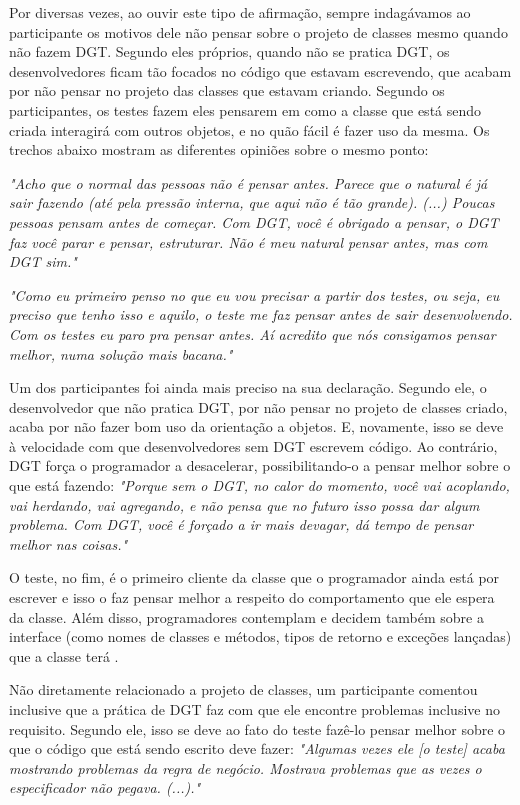 Por diversas vezes, ao ouvir este tipo de afirmação, sempre indagávamos ao participante
os motivos dele não pensar sobre o projeto de classes mesmo quando não fazem DGT. 
Segundo eles próprios, quando não se pratica DGT, os desenvolvedores ficam
tão focados no código que estavam escrevendo, que acabam por não pensar no
projeto das classes que estavam criando. Segundo os participantes, os testes fazem eles pensarem
em como a classe que está sendo criada interagirá com outros objetos, e no quão
fácil é fazer uso da mesma.
Os trechos abaixo mostram as diferentes opiniões sobre o mesmo ponto:

\textit{"Acho que o normal das pessoas não é pensar antes. Parece que o natural
é já sair fazendo (até pela pressão interna, que aqui não é tão grande). (...) Poucas pessoas pensam
antes de começar. Com DGT, você é obrigado a pensar, o DGT faz você parar e pensar, estruturar. Não
é meu natural pensar antes, mas com DGT sim."}

\textit{"Como eu primeiro penso no que eu vou precisar a partir dos testes, ou seja, eu preciso que tenho
isso e aquilo, o teste me faz pensar antes de sair desenvolvendo. Com os testes eu paro pra pensar antes.
Aí acredito que nós consigamos pensar melhor, numa solução mais bacana."}

Um dos participantes foi ainda mais preciso na sua declaração. Segundo ele, o desenvolvedor que não pratica
DGT, por não pensar no projeto de classes criado, acaba por não fazer bom uso da orientação a objetos.
E, novamente, isso se deve à velocidade com que desenvolvedores sem DGT escrevem código. Ao contrário,
DGT força o programador a desacelerar, possibilitando-o a pensar melhor sobre o que está fazendo:
\textit{"Porque sem o DGT, no calor do momento, você vai acoplando, vai herdando, vai agregando, e não pensa
que no futuro isso possa dar algum problema. Com DGT, você é forçado a ir mais devagar, dá tempo de pensar melhor nas
coisas."}

O teste, no fim, é o primeiro cliente da classe que o programador ainda está por escrever e 
isso o faz pensar melhor a respeito do comportamento que ele espera da classe. Além disso,
programadores contemplam e decidem também sobre a interface (como nomes de
classes e métodos, tipos de retorno e exceções lançadas) que a classe terá
\cite{janzen-saiedian}.

Não diretamente relacionado a projeto de classes, um participante comentou inclusive
que a prática de DGT faz com que ele encontre problemas inclusive no requisito. Segundo ele,
isso se deve ao fato do teste fazê-lo pensar melhor sobre o que o código que está 
sendo escrito deve fazer:
\textit{"Algumas vezes ele [o teste] acaba mostrando problemas da regra de negócio. Mostrava problemas
que as vezes o especificador não pegava. (...)."}

